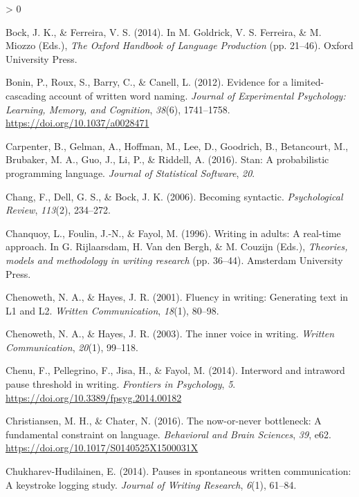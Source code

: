 \documentclass[
  english,
  man,floatsintext]{apa7}
\newlength{\cslhangindent}
\newenvironment{CSLReferences}[2] %
 {%
  \setlength{\parindent}{0pt}
  \ifodd #1 \everypar{\setlength{\hangindent}{\cslhangindent}}\ignorespaces\fi
  \ifnum #2 > 0
  \setlength{\parskip}{#2\baselineskip}
  \fi
 }%
 {}
\begin{document}
\begin{CSLReferences}{1}{0}
\leavevmode\hypertarget{ref-bock2014syntactically}{}%
Bock, J. K., \& Ferreira, V. S. (2014). In M. Goldrick, V. S. Ferreira, \& M. Miozzo (Eds.), \emph{{The Oxford Handbook of Language Production}} (pp. 21--46). Oxford University Press.

\leavevmode\hypertarget{ref-bonin2012evidence}{}%
Bonin, P., Roux, S., Barry, C., \& Canell, L. (2012). Evidence for a limited-cascading account of written word naming. \emph{Journal of Experimental Psychology: Learning, Memory, and Cognition}, \emph{38}(6), 1741--1758. \url{https://doi.org/10.1037/a0028471}

\leavevmode\hypertarget{ref-carpenter2016stan}{}%
Carpenter, B., Gelman, A., Hoffman, M., Lee, D., Goodrich, B., Betancourt, M., Brubaker, M. A., Guo, J., Li, P., \& Riddell, A. (2016). Stan: A probabilistic programming language. \emph{Journal of Statistical Software}, \emph{20}.

\leavevmode\hypertarget{ref-chang2006}{}%
Chang, F., Dell, G. S., \& Bock, J. K. (2006). Becoming syntactic. \emph{Psychological Review}, \emph{113}(2), 234--272.

\leavevmode\hypertarget{ref-chanquoy1996writing}{}%
Chanquoy, L., Foulin, J.-N., \& Fayol, M. (1996). Writing in adults: {A} real-time approach. In G. Rijlaarsdam, H. Van den Bergh, \& M. Couzijn (Eds.), \emph{Theories, models and methodology in writing research} (pp. 36--44). Amsterdam University Press.

\leavevmode\hypertarget{ref-chenoweth2001fluency}{}%
Chenoweth, N. A., \& Hayes, J. R. (2001). Fluency in writing: Generating text in {L1} and {L2}. \emph{Written Communication}, \emph{18}(1), 80--98.

\leavevmode\hypertarget{ref-chenoweth2003inner}{}%
Chenoweth, N. A., \& Hayes, J. R. (2003). The inner voice in writing. \emph{Written Communication}, \emph{20}(1), 99--118.

\leavevmode\hypertarget{ref-chenu2014interword}{}%
Chenu, F., Pellegrino, F., Jisa, H., \& Fayol, M. (2014). Interword and intraword pause threshold in writing. \emph{Frontiers in Psychology}, \emph{5}. \url{https://doi.org/10.3389/fpsyg.2014.00182}

\leavevmode\hypertarget{ref-christiansen2016now}{}%
Christiansen, M. H., \& Chater, N. (2016). The now-or-never bottleneck: A fundamental constraint on language. \emph{Behavioral and Brain Sciences}, \emph{39}, e62. \url{https://doi.org/10.1017/S0140525X1500031X}

\leavevmode\hypertarget{ref-chukharev2014pauses}{}%
Chukharev-Hudilainen, E. (2014). Pauses in spontaneous written communication: {A} keystroke logging study. \emph{Journal of Writing Research}, \emph{6}(1), 61--84.


\end{CSLReferences}
\end{document}
